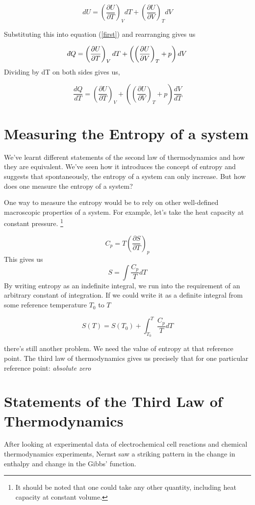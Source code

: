 \documentclass{article}
\def\dbar{{\mathchar'26\mkern-12mu d}}
\begin{document}
	$$ dU = \left(\frac{\partial U}{\partial T}\right)_VdT + \left(\frac{\partial U}{\partial V}\right)_TdV $$ 
	
	Substituting this into equation (\ref{first}) and rearranging gives us
	
	$$ \dbar Q = \left(\frac{\partial U}{\partial T}\right)_V dT + \left(\left(\frac{\partial U}{\partial V}\right)_T + p\right)dV $$
	Dividing by dT on both sides gives us,
	
	$$ \frac{dQ}{dT} = \left(\frac{\partial U}{\partial T}\right)_V + \left(\left(\frac{\partial U}{\partial V}\right)_T + p\right)\frac{dV}{dT}$$
	
	\section{Measuring the Entropy of a system}
	We've learnt different statements of the second law of thermodynamics and how they are equivalent. We've seen how it introduces the concept of entropy and suggests that spontaneously, the entropy of a system can only increase. But how does one measure the entropy of a system?
	
	One way to measure the entropy would be to rely on other well-defined macroscopic properties of a system. For example, let's take the heat capacity at constant pressure. \footnote{It should be noted that one could take any other quantity, including heat capacity at constant volume.}
	
	$$C_p = T\left(\frac{\partial S}{\partial T}\right)_p $$
	This gives us
	$$ S = \int\frac{C_p}{T}dT $$
	By writing entropy as an indefinite integral, we run into the requirement of an arbitrary constant of integration. If we could write it as a definite integral from some reference temperature $T_0$ to $T$
	
	$$ S(T) = S(T_0) + \int_{T_0}^{T}\frac{C_p}{T}dT$$
	
	there's still another problem. We need the value of entropy at that reference point. The third law of thermodynamics gives us precisely that for one particular reference point: \textit{absolute zero}
	
	\section{Statements of the Third Law of Thermodynamics}
	After looking at experimental data of electrochemical cell reactions and chemical thermodynamics experiments, Nernst saw a striking pattern in the change in enthalpy and change in the Gibbs' function.
	
\end{document}
